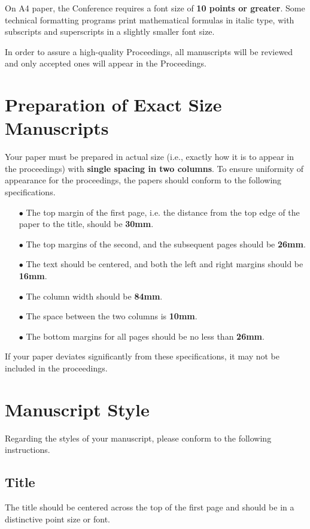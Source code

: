\documentclass[a4paper]{article}
\begin{document}
On A4 paper, the Conference requires a font size of {\bf 10 points or greater}.
Some technical formatting programs print mathematical formulas in italic type, with
subscripts and superscripts in a slightly smaller font size. 

In order to assure a high-quality Proceedings, all manuscripts will be reviewed and
only accepted ones will appear in the Proceedings.


\section{Preparation of Exact Size Manuscripts}

Your paper must be prepared in actual size (i.e., exactly how it is to appear in the
proceedings) with {\bf single spacing in two columns}.
To ensure uniformity of appearance for the proceedings, the papers should conform to
the following specifications.
\begin{enumerate}
\item[$\bullet$]
The top margin of the first page, i.e. the distance from the top edge of the paper
to the title, should be {\bf 30mm}.
\item[$\bullet$]
The top margins of the second, and the subsequent pages should be {\bf 26mm}.
\item[$\bullet$]
The text should be centered, and both the left and right margins should be {\bf 16mm}.
\item[$\bullet$]
The column width should be {\bf 84mm}.
\item[$\bullet$]
The space between the two columns is {\bf 10mm}.
\item[$\bullet$]
The bottom margins for all pages should be no less than {\bf 26mm}.
\end{enumerate}

If your paper deviates significantly from these specifications, it may not be
included in the proceedings. 


\section{Manuscript Style}

Regarding the styles of your manuscript, please conform to the following 
instructions. 

\subsection{Title}
The title should be centered across the top of the first page and should 
be in a distinctive point size or font.
\end{document}
